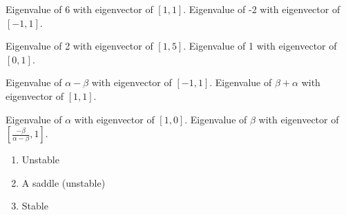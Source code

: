 \documentclass[]{memoir}
\begin{document}

Eigenvalue of 6 with eigenvector of $[1,1]$. Eigenvalue of -2 with
eigenvector of $[-1,1]$.


Eigenvalue of 2 with eigenvector of $[1,5]$. Eigenvalue of 1 with
eigenvector of $[0,1]$.


Eigenvalue of $\alpha-\beta$ with eigenvector of $[-1,1]$. Eigenvalue of
$\beta+\alpha$ with eigenvector of $[1,1]$.


Eigenvalue of $\alpha$ with eigenvector of $[1,0]$. Eigenvalue of
$\beta$ with eigenvector of
$\left[\frac{-\beta}{\alpha-\beta},1 \right]$.


\begin{enumerate}
\def\labelenumi{\arabic{enumi}.}
\itemsep1pt\parskip0pt
\item
  Unstable
\item
  A saddle (unstable)
\item
  Stable
\end{enumerate}

\end{document}

